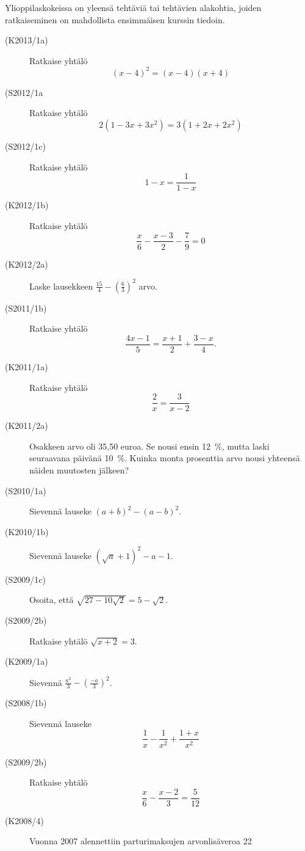 Ylioppilaskokeissa on yleensä tehtäviä tai tehtävien alakohtia, joiden ratkaiseminen on mahdollista ensimmäisen kurssin tiedoin.

\begin{description}
	\item[(K2013/1a)]  Ratkaise yhtälö
						\[(x-4)^2=(x-4)(x+4)\]

	\item[(S2012/1a]   Ratkaise yhtälö
						\[2(1-3x+3x^2)=3(1+2x+2x^2)\]
	\item[(S2012/1c)]  Ratkaise yhtälö
						\[1-x=\frac{1}{1-x}\]

    \item[(K2012/1b)]  Ratkaise yhtälö
                        \[\frac{x}{6} - \frac{x-3}{2} - \frac{7}{9} = 0 \]
    \item[(K2012/2a)]  Laske lausekkeen $ \frac{15}{4} - \left( \frac{6}{3} \right)^2 $ arvo.
    \item[(S2011/1b)]  Ratkaise yhtälö
                        \[ \frac{4x - 1}{5} = \frac{x + 1}{2} + \frac{3 - x}{4}. \]
    \item[(K2011/1a)]  Ratkaise yhtälö
                        \[ \frac{2}{x} = \frac{3}{x - 2} \]
    \item[(K2011/2a)]  Osakkeen arvo oli 35,50 euroa. Se nousi ensin 12~\%,
                        mutta laski seuraavana päivänä 10~\%. Kuinka monta prosenttia
                        arvo nousi yhteensä näiden muutosten jälkeen?
    \item[(S2010/1a)]  Sievennä lauseke $ (a + b)^2 - (a - b)^2 $.
    \item[(K2010/1b)]  Sievennä lauseke $ (\sqrt{a} + 1)^2 - a - 1 $.
    \item[(S2009/1c)]  Osoita, että $ \sqrt{27 - 10 \sqrt{ 2} } = 5 - \sqrt{2} $.
    \item[(S2009/2b)]  Ratkaise yhtälö $ \sqrt{x + 2 } = 3  $.
    \item[(K2009/1a)]  Sievennä $ \frac{a^2}{3} - \left( \frac{-a}{3} \right)^2 $.
    \item[(S2008/1b)]  Sievennä lauseke
                        \[ \frac{1}{x} - \frac{1}{x^2} + \frac{1 + x}{x^2} \]
    \item[(S2009/2b)]  Ratkaise yhtälö
                        \[ \frac{x}{6} - \frac{x - 2}{3} = \frac{5}{12} \]
    \item[(K2008/4)]   Vuonna 2007 alennettiin parturimaksujen arvonlisäveroa 22

\end{description}

